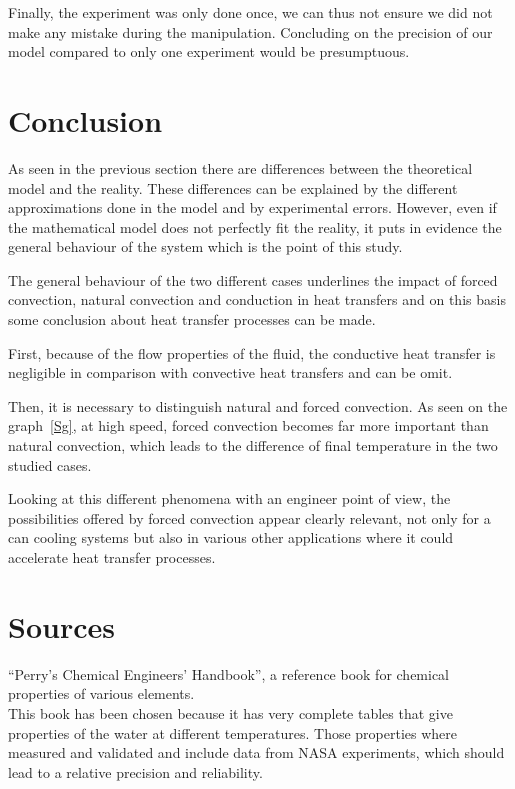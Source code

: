 \documentclass{report}
\begin{document}
	Finally, the experiment was only done once, we can thus not ensure we did not make any mistake during the manipulation. Concluding on the precision of our model compared to only one experiment would be presumptuous.
	
	\chapter{Conclusion}\label{ccl}
	
	As seen in the previous section there are differences between the theoretical model and the reality. These differences can be explained by the different approximations done in the model and by experimental errors. However, even if the mathematical model does not perfectly fit the reality, it puts in evidence the general behaviour of the system which is the point of this study.
	
	The general behaviour of the two different cases underlines the impact of forced convection, natural convection and conduction in heat transfers and on this basis some conclusion about heat transfer processes can be made.
	
	First, because of the flow properties of the fluid, the conductive heat transfer is negligible in comparison with convective heat transfers and can be omit.
	
	Then, it is necessary to distinguish natural and forced convection. As seen on the graph~\ref{Sg}, at high speed, forced convection becomes far more important than natural convection, which leads to the difference of final temperature in the two studied cases.
	
	Looking at this different phenomena with an engineer point of view, the possibilities offered by forced convection appear clearly relevant, not only for a can cooling systems but also in various other applications where it could accelerate heat transfer processes.
	
	\appendix
	
	\chapter{Sources}
	
	``Perry’s	Chemical Engineers’ Handbook''\cite{properties}, a reference book for chemical properties of various elements.\\
	This book has been chosen because it has very complete tables that give properties of the water at different temperatures. Those properties where measured and validated and include data from NASA experiments, which should lead to a relative precision and reliability.
	
\end{document}
